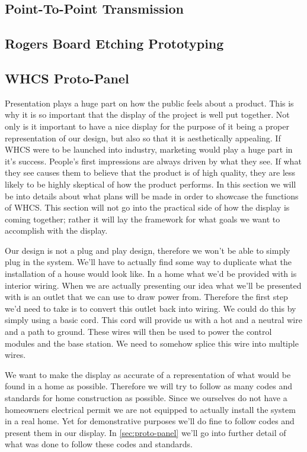 \subsection{Point-To-Point Transmission}

\subsection{Rogers Board Etching Prototyping}

\subsection{WHCS Proto-Panel}
Presentation plays a huge part on how the public feels about a product. This is
why it is so important that the display of the project is well put together.
Not only is it important to have a nice display for the purpose of it being a
proper representation of our design, but also so that it is aesthetically
appealing. If WHCS were to be launched into industry, marketing would play a
huge part in it{}'s success. People{}'s first impressions are always driven by
what they see. If what they see causes them to believe that the product is of
high quality, they are less likely to be highly skeptical of how the product
performs. In this section we will be into details about what plans will be made
in order to showcase the functions of WHCS. This section will not go into the
practical side of how the display is coming together; rather it will lay the framework for what goals we want to
accomplish with the display.

Our design is not a plug and play design, therefore we won{}'t
be able to simply plug in the system. We{}'ll have to actually find some way to
duplicate what the installation of a house would look like. In a home what
we{}'d be provided with is interior wiring. When we are actually presenting our
idea what we{}'ll be presented with is an outlet that we can use to draw power
from. Therefore the first step we{}'d need to take is to convert this outlet
back into wiring. We could do this by simply using a basic cord. This cord will
provide us with a hot and a neutral wire and a path to ground. These wires will
then be used to power the control modules and the base station. We need to
somehow splice this wire into multiple wires.

We want to make the display as accurate of a representation of
what would be found in a home as possible. Therefore we will try to follow as
many codes and standards for home construction as possible. Since we ourselves
do not have a homeowners electrical permit we are not equipped to actually
install the system in a real home. Yet for demonstrative purposes we{}'ll do
fine to follow codes and present them in our display. In \autoref{sec:proto-panel}
we{}'ll go into further detail of what was done to follow these codes and
standards.

